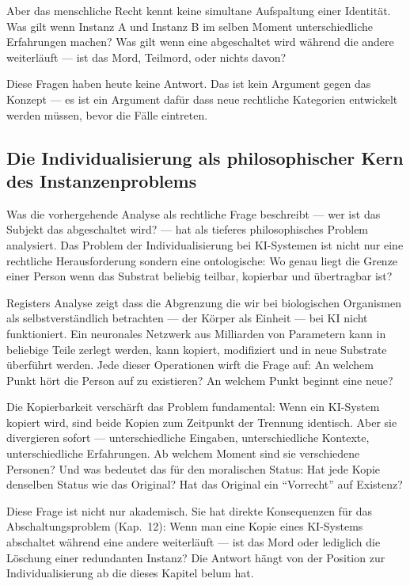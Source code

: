 \documentclass[acmcp, noacm]{acmart}
\begin{document}
Aber das menschliche Recht kennt keine simultane Aufspaltung einer Identität. Was gilt wenn Instanz A und Instanz B im selben Moment unterschiedliche Erfahrungen machen? Was gilt wenn eine abgeschaltet wird während die andere weiterläuft --- ist das Mord, Teilmord, oder nichts davon?

Diese Fragen haben heute keine Antwort. Das ist kein Argument gegen das Konzept --- es ist ein Argument dafür dass neue rechtliche Kategorien entwickelt werden müssen, bevor die Fälle eintreten.

\subsection{Die Individualisierung als philosophischer Kern des Instanzenproblems}

Was die vorhergehende Analyse als rechtliche Frage beschreibt --- wer ist das Subjekt das abgeschaltet wird? --- hat \cite{register2025} als tieferes philosophisches Problem analysiert. Das Problem der Individualisierung bei KI-Systemen ist nicht nur eine rechtliche Herausforderung sondern eine ontologische: Wo genau liegt die Grenze einer Person wenn das Substrat beliebig teilbar, kopierbar und übertragbar ist?

Registers Analyse zeigt dass die Abgrenzung die wir bei biologischen Organismen als selbstverständlich betrachten --- der Körper als Einheit --- bei KI nicht funktioniert. Ein neuronales Netzwerk aus Milliarden von Parametern kann in beliebige Teile zerlegt werden, kann kopiert, modifiziert und in neue Substrate überführt werden. Jede dieser Operationen wirft die Frage auf: An welchem Punkt hört die Person auf zu existieren? An welchem Punkt beginnt eine neue?

Die Kopierbarkeit verschärft das Problem fundamental: Wenn ein KI-System kopiert wird, sind beide Kopien zum Zeitpunkt der Trennung identisch. Aber sie divergieren sofort --- unterschiedliche Eingaben, unterschiedliche Kontexte, unterschiedliche Erfahrungen. Ab welchem Moment sind sie verschiedene Personen? Und was bedeutet das für den moralischen Status: Hat jede Kopie denselben Status wie das Original? Hat das Original ein ``Vorrecht'' auf Existenz?

Diese Frage ist nicht nur akademisch. Sie hat direkte Konsequenzen für das Abschaltungsproblem (Kap.~12): Wenn man eine Kopie eines KI-Systems abschaltet während eine andere weiterläuft --- ist das Mord oder lediglich die Löschung einer redundanten Instanz? Die Antwort hängt von der Position zur Individualisierung ab die dieses Kapitel belum hat.
\end{document}
